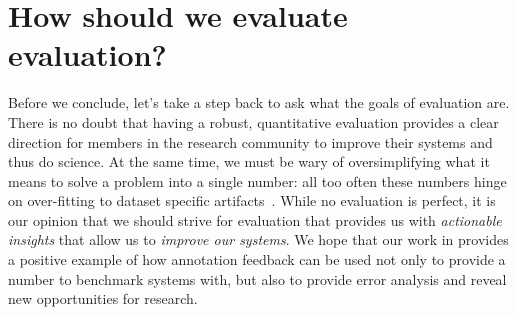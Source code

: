 
\section{How should we evaluate evaluation?}
Before we conclude, let's take a step back to ask what the goals of evaluation are.
There is no doubt that having a robust, quantitative evaluation provides a clear direction for members in the research community to improve their systems and thus do science.
At the same time, we must be wary of oversimplifying what it means to solve a problem into a single number:
all too often these numbers hinge on over-fitting to dataset specific artifacts~\citep{gururangan2018annotation}.
While no evaluation is perfect, it is our opinion that we should strive for evaluation that provides us with \textit{actionable insights} that allow us to \textit{improve our systems}.
We hope that our work in  provides a positive example of how annotation feedback can be used not only to provide a number to benchmark systems with, but also to provide error analysis and reveal new opportunities for research.



